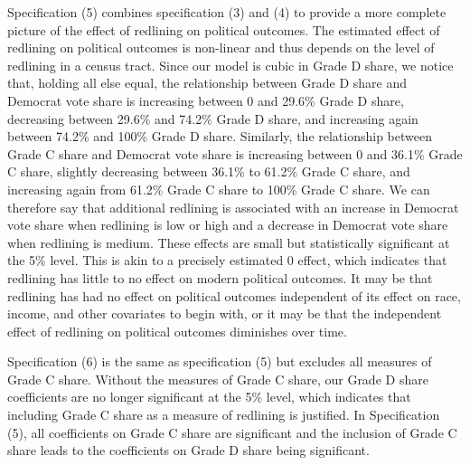 \documentclass{eco_375_paper}
\begin{document}
Specification (5) combines specification (3) and (4) to provide a more complete picture of the effect of redlining on political outcomes. The estimated effect of redlining on political outcomes is non-linear and thus depends on the level of redlining in a census tract. Since our model is cubic in Grade D share, we notice that, holding all else equal, the relationship between Grade D share and Democrat vote share is increasing between 0 and  29.6\% Grade D share, decreasing between 29.6\% and 74.2\% Grade D share, and increasing again between 74.2\% and 100\% Grade D share. Similarly, the relationship between Grade C share and Democrat vote share is increasing between 0 and 36.1\% Grade C share, slightly decreasing between 36.1\% to 61.2\% Grade C share, and increasing again from 61.2\% Grade C share to 100\% Grade C share. We can therefore say that additional redlining is associated with an increase in Democrat vote share when redlining is low or high and a decrease in Democrat vote share when redlining is medium. These effects are small but statistically significant at the 5\% level. This is akin to a precisely estimated 0 effect, which indicates that redlining has little to no effect on modern political outcomes. It may be that redlining has had no effect on political outcomes independent of its effect on race, income, and other covariates to begin with, or it may be that the independent effect of redlining on political outcomes diminishes over time.

Specification (6) is the same as specification (5) but excludes all measures of Grade C share. Without the measures of Grade C share, our Grade D share coefficients are no longer significant at the 5\% level, which indicates that including Grade C share as a measure of redlining is justified. In Specification (5), all coefficients on Grade C share are significant and the inclusion of Grade C share leads to the coefficients on Grade D share being significant.
\end{document}
